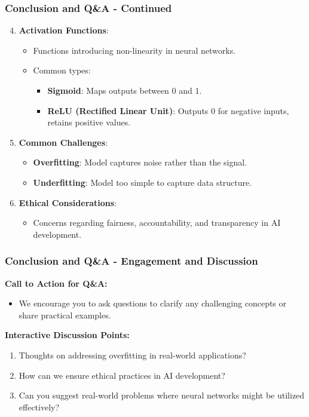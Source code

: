 \documentclass[aspectratio=169]{beamer}
\begin{document}
\begin{frame}[fragile]
    \frametitle{Conclusion and Q\&A - Continued}
    \begin{enumerate}
        \setcounter{enumi}{3} %
        \item \textbf{Activation Functions}:
        \begin{itemize}
            \item Functions introducing non-linearity in neural networks.
            \item Common types:
            \begin{itemize}
                \item \textbf{Sigmoid}: Maps outputs between 0 and 1.
                \item \textbf{ReLU (Rectified Linear Unit)}: Outputs 0 for negative inputs, retains positive values.
            \end{itemize}
        \end{itemize}
        
        \item \textbf{Common Challenges}:
        \begin{itemize}
            \item \textbf{Overfitting}: Model captures noise rather than the signal.
            \item \textbf{Underfitting}: Model too simple to capture data structure.
        \end{itemize}
        
        \item \textbf{Ethical Considerations}:
        \begin{itemize}
            \item Concerns regarding fairness, accountability, and transparency in AI development.
        \end{itemize}
    \end{enumerate}
\end{frame}

\begin{frame}[fragile]
    \frametitle{Conclusion and Q\&A - Engagement and Discussion}
    \textbf{Call to Action for Q\&A:}
    \begin{itemize}
        \item We encourage you to ask questions to clarify any challenging concepts or share practical examples.
    \end{itemize}

    \textbf{Interactive Discussion Points:}
    \begin{enumerate}
        \item Thoughts on addressing overfitting in real-world applications?
        \item How can we ensure ethical practices in AI development?
        \item Can you suggest real-world problems where neural networks might be utilized effectively?
    \end{enumerate}
\end{frame}
\end{document}
